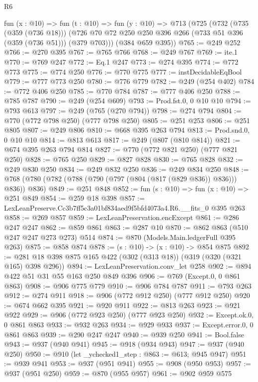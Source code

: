 \begin{lexlean}{R6}
\begin{coremodule}
  fun (x : @10) =>
  fun (t : @10) =>
  fun (y : @10) =>
  @713
    (@725
      (@732
        (@735 (@359 (@736 @18)))
        (@726 @70 @72 @250 @250 @396 @266 (@733 @51 @396 (@359 (@736 @51))) (@379 @703)))
      (@384 @659 @395))
@765 := @249 @252
@766 := @270 @395
@767 := @765 @766
@768 := @249 @767
@769 := ite.{1}
@770 := @769 @247
@772 := Eq.{1} @247
@773 := @274 @395
@774 := @772 @773
@775 := @774 @250
@776 := @770 @775
@777 := instDecidableEqBool
@779 := @777 @773 @250
@780 := @776 @779
@782 := @249 (@254 @402)
@784 := @772 @406 @250
@785 := @770 @784
@787 := @777 @406 @250
@788 := @785 @787
@790 := @249 (@254 @609)
@793 := Prod.fst.{0, 0} @10 @10
@794 := @793 @613
@797 := @249 (@765 (@270 @794))
@798 := @274 @794
@804 := @770 (@772 @798 @250) (@777 @798 @250)
@805 := @251 @253
@806 := @251 @805
@807 := @249 @806
@810 := @668 @395 @263 @794
@813 := Prod.snd.{0, 0} @10 @10
@814 := @813 @613
@817 := @249 (@807 (@810 @814))
@821 := @674 @395 @263 @794 @814
@827 := @770 (@772 @821 @250) (@777 @821 @250)
@828 := @765 @250
@829 := @827 @828
@830 := @765 @828
@832 := @249 @830 @250
@834 := @249 @832 @250
@836 := @249 @834 @250
@848 := @768 (@780 (@782 (@788 (@790 (@797 (@804 (@817 (@829 @836)) @836))) @836)) @836)
@849 := @251 @848
@852 := fun (s : @10) => fun (x : @10) => @251 @849
@854 := @259 @18 @398
@857 := LexLeanPreserve.Cc3b7ff5c3a01bf834aed9f5bfd4073a4.R6.__fits_0 @395 @263
@858 := @269 @857
@859 := LexLeanPreservation.encExcept
@861 := @286 @247 @247
@862 := @859 @861
@863 := @287 @10
@870 := @862 @863 (@510 @247 @247 @273 @273) @514
@874 := @870 (Models.Main.ledgerFull @395 @263)
@875 := @858 @874
@878 := (s : @10) -> (x : @10) -> @854 @875
@892 := @281 @18 @398 @875 @165 @422 (@302 (@313 @18)) (@319 (@320 (@321 @165) @398 @296))
@894 := LexLeanPreservation.conv_let @258
@902 := @894 @422 @51 @31 @55 @163 @250 @849 @396
@906 := @769 (Except.{0, 0} @861 @863)
@908 := @906 @775 @779
@910 := @906 @784 @787
@911 := @793 @263
@912 := @274 @911
@918 := @906 (@772 @912 @250) (@777 @912 @250)
@920 := @674 @662 @395
@921 := @920 @911
@922 := @813 @263
@923 := @921 @922
@929 := @906 (@772 @923 @250) (@777 @923 @250)
@932 := Except.ok.{0, 0} @861 @863
@933 := @932 @263
@934 := @929 @933
@937 := Except.error.{0, 0} @861 @863
@939 := @290 @247 @247
@940 := @939 @250
@941 := Bool.false
@943 := @937 (@940 @941)
@945 := @918 (@934 @943)
@947 := @937 (@940 @250)
@950 := @910 (let _ychecked1_step : @863 := @613; @945 @947)
@951 := @939 @941
@953 := @937 (@951 @941)
@955 := @908 (@950 @953)
@957 := @937 (@951 @250)
@959 := @870 (@955 @957)
@961 := @902 @959 @575

\end{coremodule}
\end{lexlean}
